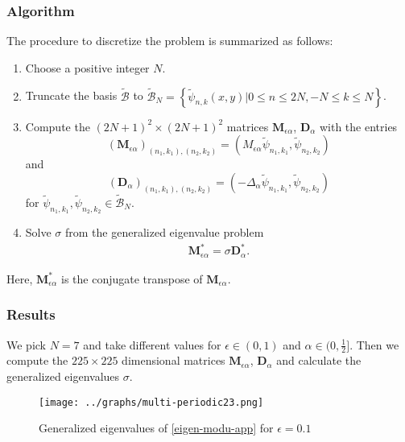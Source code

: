 \documentclass[1 [leqno, 11pt]{amsart}
\numberwithin{equation}{section}
\let\ep=\epsilon
\begin{document}
\begin{CJK*}{GBK}{song}
 \subsubsection{Algorithm}
The procedure to discretize the problem is summarized as follows:
\begin{enumerate}
 \item Choose a positive integer $N$.
 \item Truncate the basis $\tilde{\mathcal{B}}$ to $\tilde{\mathcal{B}}_N = \left\{\tilde{\psi}_{n,k}(x,y) | 0\leq n \leq2N,  -N \leq k \leq N\right\}$.
 \item Compute the $(2N + 1)^2 \times (2N+1)^2$ matrices $\mathbf{M}_{\ep\alpha}$, $\mathbf{D}_{\alpha}$ with the entries
 $$(\mathbf{M}_{\ep\alpha})_{(n_1, k_1), (n_2, k_2)} = (M_{\ep\alpha} \tilde{\psi}_{n_1, k_1}, \tilde{\psi}_{n_2, k_2}) $$
 and
 $$(\mathbf{D}_{\alpha})_{(n_1, k_1), (n_2, k_2)} = (-\Delta_{\alpha} \tilde{\psi}_{n_1, k_1}, \tilde{\psi}_{n_2, k_2}) $$
 for $\tilde{\psi}_{n_1, k_1},  \tilde{\psi}_{n_2, k_2} \in \tilde{\mathcal{B}}_N.$
 \item Solve $\sigma$ from the generalized eigenvalue problem
\begin{align}\label{eigen-modu-app}
\mathbf{M}_{\ep\alpha}^* =\sigma \mathbf{D}_{\alpha}^*.
\end{align}
 \end{enumerate}
Here, $\mathbf{M}_{\ep\alpha}^*$ is the  conjugate transpose of $\mathbf{M}_{\ep\alpha}$.
 \subsubsection{Results}
 We pick $N = 7$ and take different values for $\epsilon \in (0, 1)$ and $\alpha \in (0, \frac 1 2]$. Then  we compute the $225 \times 225$ dimensional matrices $\mathbf{M}_{\ep\alpha}$, $\mathbf{D}_{\alpha}$ and calculate the generalized eigenvalues $\sigma$.
\begin{figure}[ht]
    \centering
	\texttt{[image: ../graphs/multi-periodic23.png]}
	\caption{Generalized eigenvalues of \eqref{eigen-modu-app} for  $\ep = 0.1$}
	\label{fig:tenthFig-mul}
\end{figure}


\end{CJK*}
\end{document}
